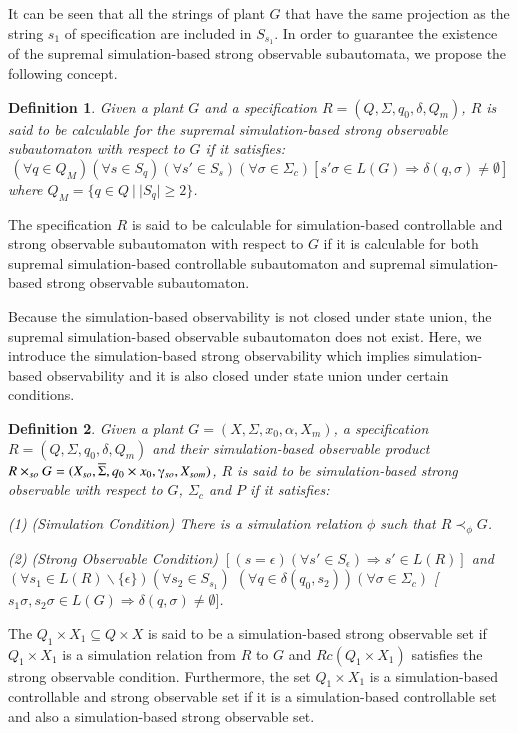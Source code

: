 \documentclass[12pt,draftcls,onecolumn]{IEEEtran}
\newtheorem{Definition}{Definition}
\begin{document}
It can be seen that all the strings of plant $G$ that have the same
projection as the string $s_1$ of specification are included in
$S_{s_1}$. In order to guarantee the existence of the supremal
simulation-based strong observable subautomata, we propose the
following concept.

\begin{Definition}
Given a plant $G$ and a specification
$R=(Q,\Sigma,q_{0},\delta,Q_{m})$, $R$ is said to be calculable
for the supremal simulation-based strong observable subautomaton
with respect to $G$ if it satisfies:
\[
(\forall q \in Q_{M})(\forall s \in S_q)(\forall s' \in
S_{s})(\forall \sigma \in \Sigma_{c})[s'\sigma \in L(G)
\Rightarrow \delta(q, \sigma) \neq \emptyset]
\]
where $Q_{M}=\{q \in Q~|~ |S_q| \geq 2\}$.
\end{Definition}

The specification $R$ is said to be calculable for
simulation-based controllable and strong observable subautomaton
with respect to $G$ if it is calculable for both supremal
simulation-based controllable subautomaton and supremal
simulation-based strong observable subautomaton.

Because the simulation-based observability is not closed under
state union, the supremal simulation-based observable subautomaton
does not exist. Here, we introduce the simulation-based strong
observability which implies simulation-based observability and it
is also closed under state union under certain conditions.
\begin{Definition}
Given a plant $G =(X,\Sigma,x_{0},\alpha,X_{m})$, a specification
$R =(Q,\Sigma,q_{0},\delta,Q_{m})$ and their simulation-based
observable product $R \times_{so} G = (X_{so}, \overline{\Sigma},
q_0 \times x_0, \gammaup_{so}, X_{som})$, $R$ is said to be
simulation-based strong observable with respect to $G$,
$\Sigma_{c}$ and $P$ if it satisfies:

(1) (Simulation Condition) There is a simulation relation $\phi$
such that $R \prec_{\phi} G$.

(2) (Strong Observable Condition) $[(s = \epsilon)(\forall s' \in
S_{\epsilon}) \Rightarrow s' \in L(R)]$ and $(\forall s_1 \in L(R)
\backslash \{\epsilon\})$$(\forall s_2 \in S_{s_1})$ $(\forall q
\in \delta(q_0, s_2))$$(\forall \sigma \in \Sigma_{c})$
[$s_1\sigma, s_2\sigma \in L(G) \Rightarrow \delta(q,\sigma) \neq
\emptyset]$.
\end{Definition}

The $Q_1 \times X_1 \subseteq Q \times X$ is said to be a
simulation-based strong observable set if $Q_1 \times X_1$ is a
simulation relation from $R$ to $G$ and $Rc(Q_1 \times X_1)$
satisfies the strong observable condition. Furthermore, the set
$Q_1 \times X_1$ is a simulation-based controllable and strong
observable set if it is a simulation-based controllable set and
also a simulation-based strong observable set.
\end{document}
